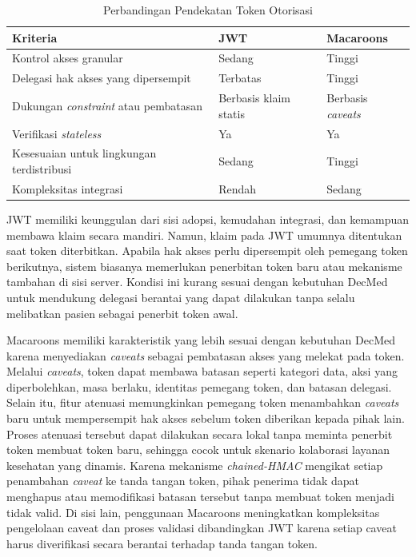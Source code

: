 \begin{table}[!ht]
    \centering
    \caption{Perbandingan Pendekatan Token Otorisasi}
    \label{tab:perbandingan-token-otorisasi}
    \small
    \begin{tabular}{|p{}|p{}|p{}|}
        \hline
        \textbf{Kriteria}                            & \textbf{JWT}          & \textbf{Macaroons}        \\ \hline
        Kontrol akses granular                       & Sedang                & Tinggi                    \\ \hline
        Delegasi hak akses yang dipersempit          & Terbatas              & Tinggi                    \\ \hline
        Dukungan \textit{constraint} atau pembatasan & Berbasis klaim statis & Berbasis \textit{caveats} \\ \hline
        Verifikasi \textit{stateless}                & Ya                    & Ya                        \\ \hline
        Kesesuaian untuk lingkungan terdistribusi    & Sedang                & Tinggi                    \\ \hline
        Kompleksitas integrasi                       & Rendah                & Sedang                    \\ \hline
    \end{tabular}
\end{table}

JWT memiliki keunggulan dari sisi adopsi, kemudahan integrasi, dan kemampuan membawa klaim secara mandiri. Namun, klaim pada JWT umumnya ditentukan saat token diterbitkan. Apabila hak akses perlu dipersempit oleh pemegang token berikutnya, sistem biasanya memerlukan penerbitan token baru atau mekanisme tambahan di sisi server. Kondisi ini kurang sesuai dengan kebutuhan DecMed untuk mendukung delegasi berantai yang dapat dilakukan tanpa selalu melibatkan pasien sebagai penerbit token awal.

Macaroons memiliki karakteristik yang lebih sesuai dengan kebutuhan DecMed karena menyediakan \textit{caveats} sebagai pembatasan akses yang melekat pada token. Melalui \textit{caveats}, token dapat membawa batasan seperti kategori data, aksi yang diperbolehkan, masa berlaku, identitas pemegang token, dan batasan delegasi. Selain itu, fitur atenuasi memungkinkan pemegang token menambahkan \textit{caveats} baru untuk mempersempit hak akses sebelum token diberikan kepada pihak lain. Proses atenuasi tersebut dapat dilakukan secara lokal tanpa meminta penerbit token membuat token baru, sehingga cocok untuk skenario kolaborasi layanan kesehatan yang dinamis. Karena mekanisme \textit{chained-HMAC} mengikat setiap penambahan \textit{caveat} ke tanda tangan token, pihak penerima tidak dapat menghapus atau memodifikasi batasan tersebut tanpa membuat token menjadi tidak valid. Di sisi lain, penggunaan Macaroons meningkatkan kompleksitas pengelolaan caveat dan proses validasi dibandingkan JWT karena setiap caveat harus diverifikasi secara berantai terhadap tanda tangan token.

